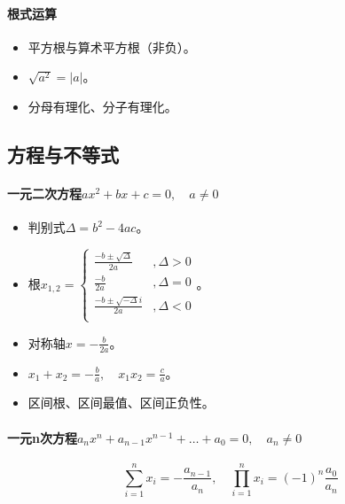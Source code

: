 \documentclass[
12pt, %
a4paper, 
oneside, %
]{scrartcl}
\begin{document}
\paragraph{根式运算}
\begin{itemize}
\item 平方根与算术平方根（非负）。
\item $ \sqrt{a^2} = |a| $。
\item 分母有理化、分子有理化。
\end{itemize}
\subsection[方程与不等式]{方程与不等式}
\paragraph{一元二次方程$ a x^2 + b x + c = 0, \quad a \neq 0 $}
\begin{itemize}
\item 判别式$ \Delta = b^2 - 4ac $。
\item 根$ x_{1, 2} = \begin{cases} \frac{-b \pm \sqrt{\Delta}}{2a} &, \Delta > 0 \\ \frac{-b}{2a} &, \Delta = 0 \\ \frac{-b \pm \sqrt{-\Delta}i}{2a} &, \varDelta < 0 \\ \end{cases} $。
\item 对称轴$ x = -\frac{b}{2a} $。
\item $ x_1 + x_2 = -\frac{b}{a}, \quad x_1 x_2 = \frac{c}{a} $。
\item 区间根、区间最值、区间正负性。
\end{itemize}
\paragraph{一元n次方程$ a_n x^n + a_{n - 1} x^{n - 1} + \dots + a_0 = 0, \quad a_n \neq 0 $}
$$ \sum_{i = 1}^{n} x_i = -\frac{a_{n - 1}}{a_n}, \quad \prod_{i = 1}^{n} x_i = (-1)^n \frac{a_0}{a_n} $$ 
\end{document}
